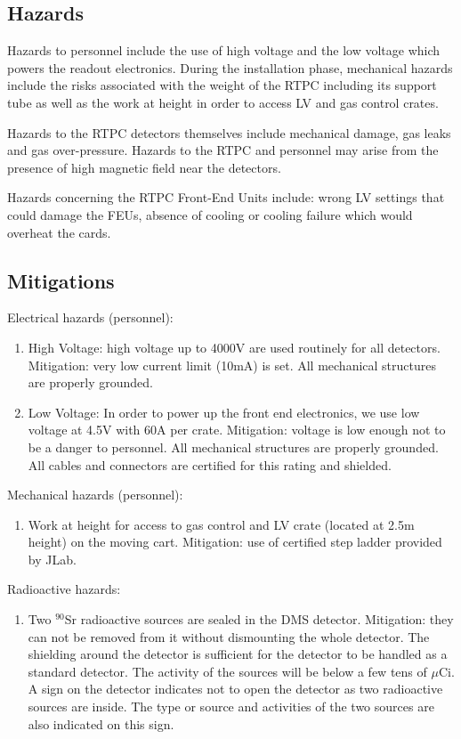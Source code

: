 \subsection{Hazards} 
Hazards to personnel include the use of high voltage and the low voltage which 
powers the readout electronics. During the installation phase, mechanical 
hazards include the risks associated with the weight of the RTPC including its 
support tube as well as the work at height in order to access LV and gas 
control crates.

Hazards to the RTPC detectors themselves include mechanical damage, gas leaks 
and gas over-pressure. Hazards to the RTPC and personnel may arise from the 
presence of high magnetic field near the detectors.

Hazards concerning the RTPC Front-End Units include: wrong LV settings that 
could damage the FEUs, absence of cooling or cooling failure which would 
overheat the cards.

\subsection{Mitigations}

Electrical hazards (personnel):

\begin{enumerate}
\item High Voltage: high voltage up to 4000V are used routinely for all 
   detectors. Mitigation: very low current limit (10mA) is set. All mechanical 
      structures are properly grounded.
\item Low Voltage: In order to power up the front end electronics, we use low 
   voltage at 4.5V with 60A per crate. Mitigation: voltage is low enough not to 
      be a danger to personnel. All mechanical structures are properly 
      grounded. All cables and connectors are certified for this rating and 
      shielded.
\end{enumerate}

Mechanical hazards (personnel):
\begin{enumerate}
\item	Work at height for access to gas control and LV crate (located at 2.5m 
   height) on the moving cart. Mitigation: use of certified step ladder 
      provided by JLab.
\end{enumerate}


Radioactive hazards:
\begin{enumerate}
\item Two $^{90}$Sr radioactive sources are sealed in the DMS detector.  
   Mitigation: they can not be removed from it without dismounting the whole 
      detector. The shielding around the detector is sufficient for the 
      detector to be handled as a standard detector. The activity of the 
      sources will be below a few tens of $\mu$Ci. A sign on the detector 
      indicates not to open the detector as two radioactive sources are inside.  
      The type or source and activities of the two sources are also indicated 
      on this sign.
\end{enumerate}


